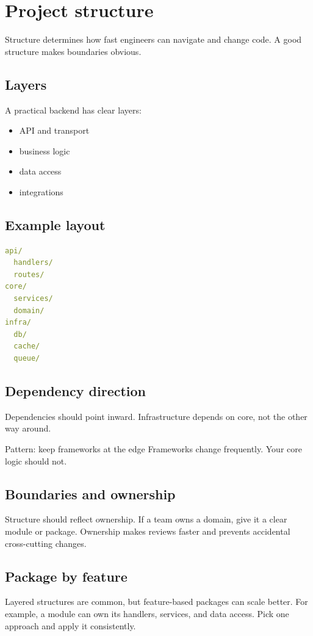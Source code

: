 \chapter{Project structure}

Structure determines how fast engineers can navigate and change code.
A good structure makes boundaries obvious.

\section{Layers}
A practical backend has clear layers:
\begin{itemize}[nosep]
  \item API and transport
  \item business logic
  \item data access
  \item integrations
\end{itemize}

\section{Example layout}
\begin{lstlisting}[language=YAML]
api/
  handlers/
  routes/
core/
  services/
  domain/
infra/
  db/
  cache/
  queue/
\end{lstlisting}

\section{Dependency direction}
Dependencies should point inward.
Infrastructure depends on core, not the other way around.

\begin{patternbox}{Pattern: keep frameworks at the edge}
Frameworks change frequently.
Your core logic should not.
\end{patternbox}

\section{Boundaries and ownership}
Structure should reflect ownership.
If a team owns a domain, give it a clear module or package.
Ownership makes reviews faster and prevents accidental cross-cutting changes.

\section{Package by feature}
Layered structures are common, but feature-based packages can scale better.
For example, a  module can own its handlers, services, and data access.
Pick one approach and apply it consistently.

